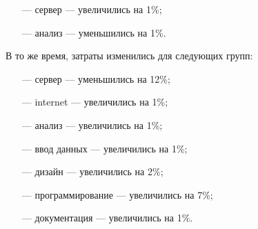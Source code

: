 
\begin{itemize}
    \item[---] сервер --- увеличились на 1\%;
    \item[---] анализ --- уменьшились на 1\%.
\end{itemize}

В то же время, затраты изменились для следующих групп:


\begin{itemize}
     \item[---] сервер --- уменьшились на 12\%;
     \item[---] internet --- увеличились на 1\%;
     \item[---] анализ --- увеличились на 1\%;
     \item[---] ввод данных --- увеличились на 1\%;
     \item[---] дизайн — увеличились на 2\%;
     \item[---] программирование --- увеличились на 7\%;
     \item[---] документация — увеличились на 1\%.
\end{itemize}

